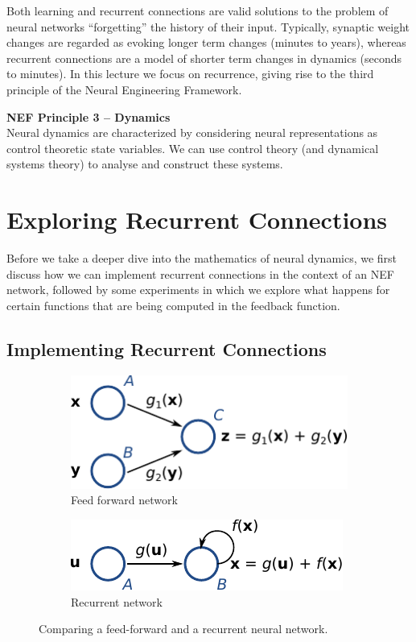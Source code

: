 \documentclass[10pt,letterpaper,oneside]{article}
\begin{document}
Both learning and recurrent connections are valid solutions to the problem of neural networks \enquote{forgetting} the history of their input. Typically, synaptic weight changes are regarded as evoking longer term changes (minutes to years), whereas recurrent connections are a model of shorter term changes in dynamics (seconds to minutes). In this lecture we focus on recurrence, giving rise to the third principle of the Neural Engineering Framework.

\begin{mdframed}
	\textbf{NEF Principle 3 -- Dynamics}\\
	Neural dynamics are characterized by considering neural representations as control theoretic state variables. We can use control theory (and dynamical systems theory) to analyse and construct these systems.
\end{mdframed}

\section{Exploring Recurrent Connections}

Before we take a deeper dive into the mathematics of neural dynamics, we first discuss how we can implement recurrent connections in the context of an NEF network, followed by some experiments in which we explore what happens for certain functions that are being computed in the feedback function.

\subsection{Implementing Recurrent Connections}

\begin{figure}[h]
	\begin{subfigure}[b]{0.6\textwidth}
		\centering
		\includegraphics{media/sum_vs_recurrent_a.pdf}
		\caption{Feed forward network}
		\label{fig:feed_forward_recurrent_a}
	\end{subfigure}
	\begin{subfigure}[b]{0.4\textwidth}
		\centering
		\includegraphics{media/sum_vs_recurrent_b.pdf}
		\caption{Recurrent network}
		\label{fig:feed_forward_recurrent_b}
	\end{subfigure}
	\caption{Comparing a feed-forward and a recurrent neural network.}
	\label{fig:feed_forward_recurrent}
\end{figure}
\end{document}
